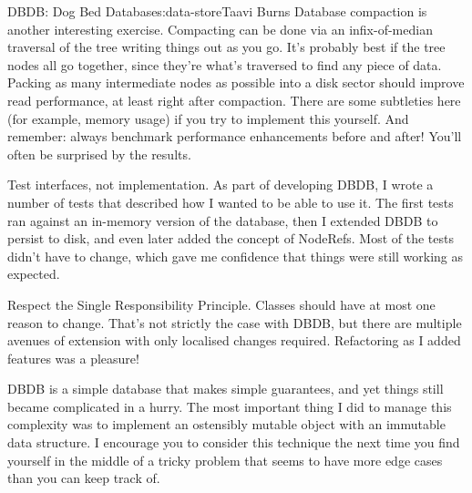 \begin{aosachapter}{DBDB: Dog Bed Database}{s:data-store}{Taavi Burns}
Database compaction is another interesting exercise. Compacting can be
done via an infix-of-median traversal of the tree writing things out as
you go. It's probably best if the tree nodes all go together, since
they're what's traversed to find any piece of data. Packing as many
intermediate nodes as possible into a disk sector should improve read
performance, at least right after compaction. There are some subtleties
here (for example, memory usage) if you try to implement this yourself.
And remember: always benchmark performance enhancements before and
after! You'll often be surprised by the results.

\label{patterns-and-principles}

Test interfaces, not implementation. As part of developing DBDB, I wrote
a number of tests that described how I wanted to be able to use it. The
first tests ran against an in-memory version of the database, then I
extended DBDB to persist to disk, and even later added the concept of
NodeRefs. Most of the tests didn't have to change, which gave me
confidence that things were still working as expected.

Respect the Single Responsibility Principle. Classes should have at most
one reason to change. That's not strictly the case with DBDB, but there
are multiple avenues of extension with only localised changes required.
Refactoring as I added features was a pleasure!

\label{summary}

DBDB is a simple database that makes simple guarantees, and yet things
still became complicated in a hurry. The most important thing I did to
manage this complexity was to implement an ostensibly mutable object
with an immutable data structure. I encourage you to consider this
technique the next time you find yourself in the middle of a tricky
problem that seems to have more edge cases than you can keep track of.

\end{aosachapter}
